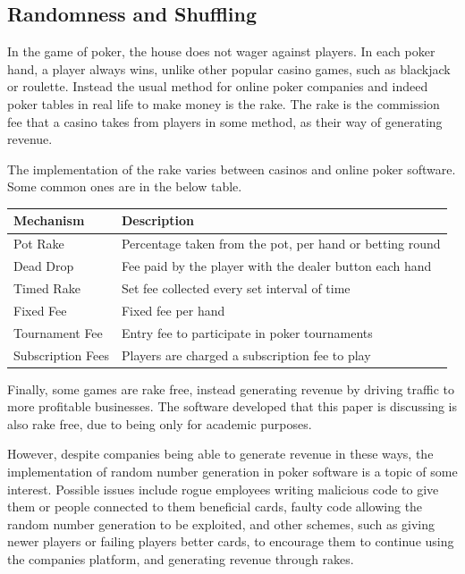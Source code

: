 \subsection{Randomness and Shuffling}
In the game of poker, the house does not wager against players. In each
poker hand, a player always wins, unlike other popular casino games, such as 
blackjack or roulette. Instead the usual method for online poker companies and
indeed poker tables in real life to make money is the rake. The rake is the 
commission fee that a casino takes from players in some method, as their way 
of generating revenue.

The implementation of the rake varies between casinos and online poker
software. Some common ones are in the below table.

\begin{center}
    \begin{tabular}{l l}
    \toprule
    Mechanism           & Description                                               \\
    \midrule
    Pot Rake            & Percentage taken from the pot, per hand or betting round  \\ \addlinespace
    Dead Drop           & Fee paid by the player with the dealer button each hand   \\ \addlinespace
    Timed Rake          & Set fee collected every set interval of time              \\ \addlinespace
    Fixed Fee           & Fixed fee per hand                                        \\ \addlinespace
    Tournament Fee      & Entry fee to participate in poker tournaments             \\ \addlinespace
    Subscription Fees   & Players are charged a subscription fee to play            \\
    \bottomrule
    \end{tabular}
\end{center}

Finally, some games are rake free, instead generating revenue by driving
traffic to more profitable businesses. The software developed that this paper
is discussing is also rake free, due to being only for academic purposes.

However, despite companies being able to generate revenue in these ways, the
implementation of random number generation in poker software is a topic of
some interest. Possible issues include rogue employees writing malicious
code to give them or people connected to them beneficial cards, faulty code
allowing the random number generation to be exploited, and other schemes, such
as giving newer players or failing players better cards, to encourage them to 
continue using the companies platform, and generating revenue through rakes.

